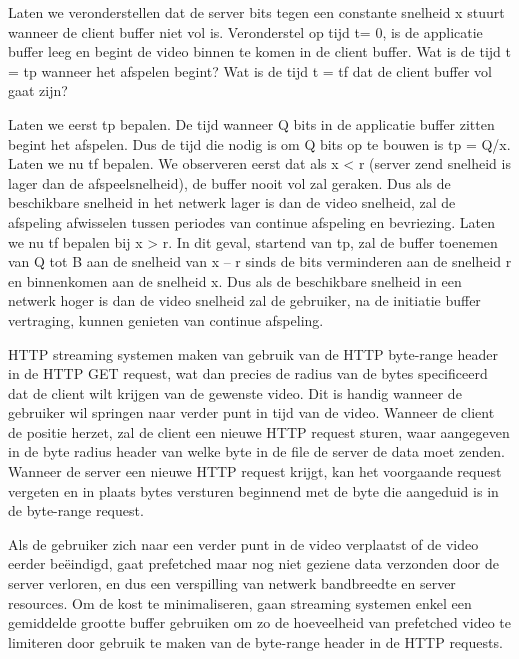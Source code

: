 
Laten we veronderstellen dat de server bits tegen een constante snelheid x stuurt wanneer de client buffer niet vol is. Veronderstel op tijd t= 0, is de applicatie buffer leeg en begint de video binnen te komen in de client buffer. Wat is de tijd t = tp wanneer het afspelen begint? Wat is de tijd t = tf dat de client buffer vol gaat zijn?

Laten we eerst tp bepalen. De tijd wanneer Q bits in de applicatie buffer zitten begint het afspelen. Dus de tijd die nodig is om Q bits op te bouwen is tp = Q/x.
Laten we nu tf bepalen. We observeren eerst dat als x < r (server zend snelheid is lager dan de afspeelsnelheid), de buffer nooit vol zal geraken. Dus als de beschikbare snelheid in het netwerk lager is dan de video snelheid, zal de afspeling afwisselen tussen periodes van continue afspeling en bevriezing.
Laten we nu tf bepalen bij x > r. In dit geval, startend van tp, zal de buffer toenemen van Q tot B aan de snelheid van x – r sinds de bits verminderen aan de snelheid r en binnenkomen aan de snelheid x. Dus als de beschikbare snelheid in een netwerk hoger is dan de video snelheid zal de gebruiker, na de initiatie buffer vertraging, kunnen genieten van continue afspeling.

\clearpage


HTTP streaming systemen maken van gebruik van de HTTP byte-range header in de HTTP GET request, wat dan precies de radius van de bytes specificeerd dat de client wilt krijgen van de gewenste video. Dit is handig wanneer de gebruiker wil springen naar verder punt in tijd van de video. Wanneer de client de positie herzet, zal de client een nieuwe HTTP request sturen, waar aangegeven in de byte radius header van welke byte in de file de server de data moet zenden. Wanneer de server een nieuwe HTTP request krijgt, kan het voorgaande request vergeten en in plaats bytes versturen beginnend met de byte die aangeduid is in de byte-range request.

Als de gebruiker zich naar een verder punt in de video verplaatst of de video eerder beëindigd, gaat prefetched maar nog niet geziene data verzonden door de server verloren, en dus een verspilling van netwerk bandbreedte en server resources. Om de kost te minimaliseren, gaan streaming systemen enkel een gemiddelde grootte buffer gebruiken om zo de hoeveelheid van prefetched video te limiteren door gebruik te maken van de byte-range header in de HTTP requests.

